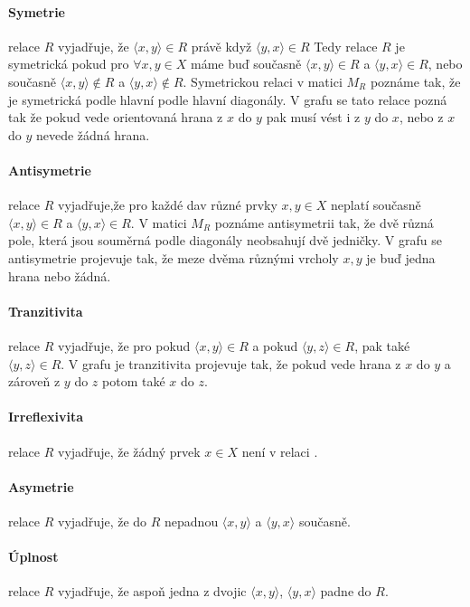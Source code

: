 \documentclass[12pt,a4paper]{article}
\begin{document}
\paragraph{Symetrie} relace $R$ vyjadřuje, že $\langle x, y \rangle \in R$ právě když  $\langle y, x \rangle \in R$ Tedy relace $R$ je symetrická pokud pro $\forall x,y \in X$ máme buď současně $\langle x, y \rangle \in R$ a  $\langle y, x \rangle \in R$, nebo současně  $\langle x, y \rangle \not\in R$ a  $\langle y, x \rangle \not\in R$. Symetrickou relaci v matici $M_R$ poznáme tak, že je symetrická podle hlavní podle hlavní diagonály. V grafu se tato relace pozná tak že pokud vede orientovaná hrana z $x$ do $y$ pak musí vést i z $y$ do $x$, nebo z $x$ do $y$ nevede žádná hrana.

\paragraph{Antisymetrie} relace $R$ vyjadřuje,že pro každé dav různé prvky $x,y \in X$ neplatí současně $\langle x, y \rangle \in R$ a  $\langle y, x \rangle \in R$. V matici $M_R$ poznáme antisymetrii tak, že dvě různá pole, která jsou souměrná podle diagonály neobsahují dvě jedničky. V grafu se antisymetrie projevuje tak, že meze dvěma různými vrcholy $x,y$ je buď jedna hrana nebo žádná.

\paragraph{Tranzitivita} relace $R$ vyjadřuje, že pro pokud $\langle x, y \rangle \in R$ a pokud $\langle y, z \rangle \in R$, pak také $\langle y, z \rangle \in R$. V grafu je tranzitivita projevuje tak, že pokud vede hrana z $x$ do $y$ a zároveň z $y$ do $z$ potom také $x$ do $z$.

\paragraph{Irreflexivita} relace $R$  vyjadřuje, že žádný prvek $x \in X$ není v relaci .
\paragraph{Asymetrie} relace $R$  vyjadřuje, že do $R$ nepadnou $\langle x, y \rangle$ a  $\langle y, x \rangle$ současně.
\paragraph{Úplnost} relace $R$  vyjadřuje, že aspoň jedna z dvojic $\langle x, y \rangle$, $\langle y, x \rangle$ padne do $R$.
\end{document}
